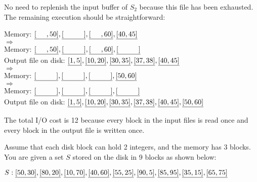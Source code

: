 \begin{sol}
\noindent No need to replenish the input buffer of $S_2$ because this file has been exhausted. The remaining execution should be straightforward:

\begin{center}
    Memory: $\uline{[\hspace{5mm}, 50]}, \uline{[\hspace{10mm}]}, \uline{[\hspace{5mm}, 60]}, \uline{[40, 45]}$ \\
    $\Rightarrow$ \\
    Memory: $\uline{[\hspace{5mm}, 50]}, \uline{[\hspace{10mm}]}, \uline{[\hspace{5mm}, 60]}, \uline{[\hspace{10mm}]}$ \\
    Output file on disk: $\uline{[1, 5]}, \uline{[10, 20]}, \uline{[30, 35]}, \uline{[37, 38]}, \uline{[40, 45]}$ \\
    $\Rightarrow$ \\
    Memory: $\uline{[\hspace{10mm}]}, \uline{[\hspace{10mm}]}, \uline{[\hspace{10mm}]}, \uline{[50, 60]}$ \\
    $\Rightarrow$ \\
    Memory: $\uline{[\hspace{10mm}]}, \uline{[\hspace{10mm}]}, \uline{[\hspace{10mm}]}, \uline{[\hspace{10mm}]}$ \\
    Output file on disk: $\uline{[1, 5]}, \uline{[10, 20]}, \uline{[30, 35]}, \uline{[37, 38]}, \uline{[40, 45]}, \uline{[50, 60]}$
\end{center}

The total I/O cost is 12 because every block in the input files is read once and every block in the output file is written once.

\end{sol}


 Assume that each disk block can hold 2 integers, and the memory has 3 blocks. You are given a set $S$ stored on the disk in 9 blocks as shown below:

\vgap

\noindent $S: \uline{[50, 30]}, \uline{[80, 20]}, \uline{[10, 70]}, \uline{[40, 60]}, \uline{[55, 25]}, \uline{[90, 5]}, \uline{[85, 95]}, \uline{[35, 15]}, \uline{[65, 75]}$

